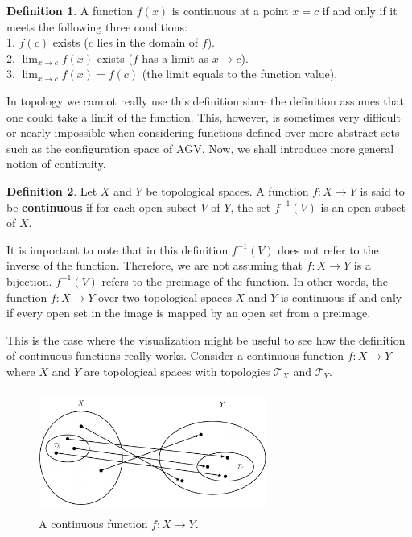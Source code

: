 \documentclass{article}
\newcommand{\topology}{\mathcal{T}}              %
\newcommand{\rarr}{\rightarrow}                  %
\theoremstyle{definition}
\newtheorem*{definition}{Definition}
\begin{document}
\begin{definition}
\cite{5} A function $f(x)$ is continuous at a point $x = c$ if and only if it meets the following
three conditions:\\
1. $f(c)$ exists ($c$ lies in the domain of $f$).\\
2. $\lim_{x \to c}f(x)$ exists ($f$ has a limit as $x \to c$).\\
3. $\lim_{x \to c}f(x) = f(c)$ (the limit equals to the function value).
\end{definition}

In topology we cannot really use this definition since the definition assumes
that one could take a limit of the function. This, however, is sometimes very difficult or nearly impossible
when considering functions defined over more abstract sets such as the configuration space
of AGV. Now, we shall introduce more general notion of continuity.

\begin{definition}
\cite{6} Let $X$ and $Y$ be topological spaces. A function $f : X \to Y$ is said to be \textbf{continuous} if
for each open subset $V$ of $Y$, the set $f^{-1}(V)$ is an open subset of $X$.
\end{definition}

It is important to note that in this definition $f^{-1}(V)$ does not refer to the inverse of the function.
Therefore, we are not assuming that $f : X \rarr Y$ is a bijection. $f^{-1}(V)$ refers to the preimage of the function.
In other words, the function $f : X \to Y$ over two topological spaces $X$ and $Y$ is continuous if and only if every open
set in the image is mapped by an open set from a preimage.

\bigskip

This is the case where the visualization might be useful to see how the definition of continuous functions really works.
Consider a continuous function $f : X \to Y$ where $X$ and $Y$ are topological spaces with topologies $\topology_X$ and $\topology_Y$.

\begin{figure}[H]
    \centering
    \includegraphics[width=7.5cm, height=4cm]{continuous-function}
    \caption*{A continuous function $f : X \to Y$.}
\end{figure}
\end{document}
